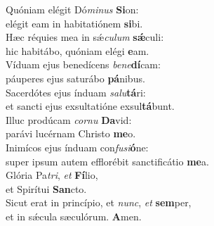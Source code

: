 \evenverse Quóniam elégit Dó\textit{mi}\textit{nus} \textbf{Si}on:~\*\\
\evenverse elégit eam in habitatiónem \textbf{si}bi.\\
\oddverse Hæc réquies mea in sǽ\textit{cu}\textit{lum} \textbf{sǽ}culi:~\*\\
\oddverse hic habitábo, quóniam elégi \textbf{e}am.\\
\evenverse Víduam ejus benedícens \textit{be}\textit{ne}\textbf{dí}cam:~\*\\
\evenverse páuperes ejus saturábo \textbf{pá}nibus.\\
\oddverse Sacerdótes ejus índuam \textit{sa}\textit{lu}\textbf{tá}ri:~\*\\
\oddverse et sancti ejus exsultatióne exsul\textbf{tá}bunt.\\
\evenverse Illuc prodúcam \textit{cor}\textit{nu} \textbf{Da}vid:~\*\\
\evenverse parávi lucérnam Christo \textbf{me}o.\\
\oddverse Inimícos ejus índuam con\textit{fu}\textit{si}\textbf{ó}ne:~\*\\
\oddverse super ipsum autem efflorébit sanctificátio \textbf{me}a.\\
\evenverse Glória Pa\textit{tri}, \textit{et} \textbf{Fí}lio,~\*\\
\evenverse et Spirítui \textbf{San}cto.\\
\oddverse Sicut erat in princípio, et \textit{nunc}, \textit{et} \textbf{sem}per,~\*\\
\oddverse et in sǽcula sæculórum. \textbf{A}men.\\
